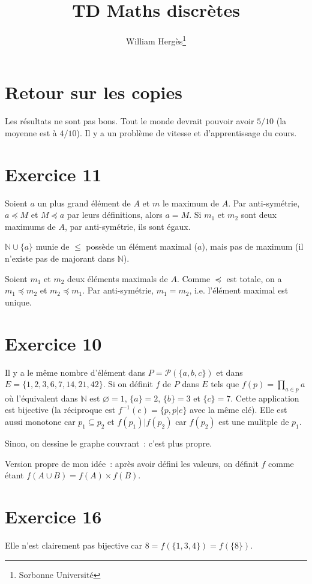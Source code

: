 \documentclass[a4paper]{article}
\title{TD Maths discrètes}
\author{William Hergès\thanks{Sorbonne Université}}
\begin{document}
	\maketitle
    \section*{Retour sur les copies}
    Les résultats ne sont pas bons.
    Tout le monde devrait pouvoir avoir $5/10$ (la moyenne est à $4/10$).
    Il y a un problème de vitesse et d'apprentissage du cours.
    \section*{Exercice 11}
    Soient $a$ un plus grand élément de $A$ et $m$ le maximum de $A$.
    Par anti-symétrie, $a\preceq M$ et $M\preceq a$ par leurs définitions, alors $a=M$.
    Si $m_1$ et $m_2$ sont deux maximums de $A$, par anti-symétrie, ils sont égaux.

    $\mathbb{N}\cup \{a\}$ munie de $\leqslant$ possède un élément maximal ($a$), mais pas de maximum (il n'existe pas
    de majorant dans $\mathbb{N}$).

    Soient $m_1$ et $m_2$ deux éléments maximals de $A$.
    Comme $\preceq$ est totale, on a $m_1\preceq m_2$ et $m_2\preceq m_1$.
    Par anti-symétrie, $m_1=m_2$, i.e. l'élément maximal est unique.
    \section*{Exercice 10}
    Il y a le même nombre d'élément dans $P=\mathcal{P}(\{a,b,c\})$ et dans $E=\{1,2,3,6,7,14,21,42\}$.
    Si on définit $f$ de $P$ dans $E$ tels que $f(p) = \prod_{a\in p} a$ où l'équivalent dans $\mathbb{N}$ est 
    $\varnothing = 1$, $\{a\}=2$, $\{b\}=3$ et $\{c\}=7$.
    Cette application est bijective (la réciproque est $f^{-1}(e) = \{p,p|e\}$ avec la même clé).
    Elle est aussi monotone car $p_1\subseteq p_2$ et $f(p_1) | f(p_2)$ car $f(p_2)$ est une mulitple de $p_1$.

    Sinon, on dessine le graphe couvrant~: c'est plus propre.

    Version propre de mon idée~: après avoir défini les valeurs, on définit $f$ comme étant
    $f(A\cup B) = f(A)\times f(B)$.
    \section*{Exercice 16}
    Elle n'est clairement pas bijective car $8 = f(\{1,3,4\}) = f(\{8\})$.
\end{document}
